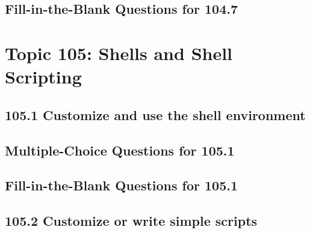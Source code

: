 \documentclass[a4paper]{report}
\begin{document}
\newpage
\section*{Fill-in-the-Blank Questions for 104.7}


\newpage
\chapter{Topic 105: Shells and Shell Scripting}

\newpage
\section*{105.1 Customize and use the shell environment}

\newpage
\section*{Multiple-Choice Questions for 105.1}

\newpage
\section*{Fill-in-the-Blank Questions for 105.1}

\newpage
\section*{105.2 Customize or write simple scripts}
\end{document}
